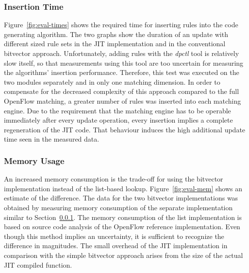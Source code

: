 \documentclass[conference]{IEEEtran}
\begin{document}
\subsubsection{Insertion Time}
\label{sec:eval-ins}
Figure~\ref{fig:eval-times} shows the required time for inserting rules into the code generating algorithm.
The two graphs show the duration of an update with different sized rule sets in the 
JIT implementation and in the conventional bitvector approach.
Unfortunately, adding rules with the \textit{dpctl} tool is relatively slow itself, so that measurements using this tool
are too uncertain for measuring the algorithms' insertion performance.
Therefore, this test was executed on the two modules separately and in only one matching dimension.
In order to compensate for the decreased complexity of this approach compared to the full OpenFlow matching,
a greater number of rules was inserted into each matching engine.
Due to the requirement that the matching engine has to be operable 
immediately after every update operation, every insertion implies a complete regeneration of the JIT code.
That behaviour induces the high additional update time seen in the measured data.

\subsubsection{Memory Usage}
An increased memory consumption is the trade-off for using the bitvector implementation
instead of the list-based lookup.
Figure~\ref{fig:eval-mem} shows an estimate of the difference.
The data for the two bitvector implementations was obtained by measuring memory consumption of the separate implementation
similar to Section~\ref{sec:eval-ins}.
The memory consumption of the list implementation is based on source code analysis of the 
OpenFlow reference implementation.
Even though this method implies an uncertainty, it is sufficient to recognize the difference in magnitudes.
The small overhead of the JIT implementation in comparison with the simple bitvector approach
arises from the size of the actual JIT compiled function.
\end{document}
